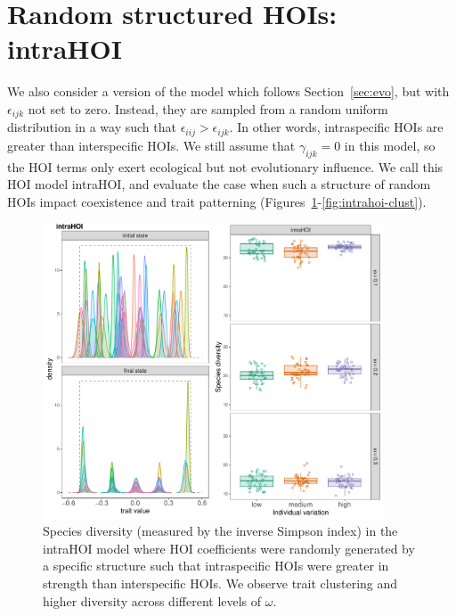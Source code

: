 \documentclass[10pt]{article}
\begin{document}
\section{Random structured HOIs: intraHOI}

We also consider a version of the model which follows Section~\ref{sec:evo}, but with $\epsilon_{ijk}$ not set to zero. Instead, they are sampled from a random uniform distribution in a way such that $\epsilon_{iij} > \epsilon_{ijk}$. In other words, intraspecific HOIs are greater than interspecific HOIs. We still assume that $\gamma_{ijk} = 0$ in this model, so the HOI terms only exert ecological but not evolutionary influence. We call this HOI model intraHOI, and evaluate the case when such a structure of random HOIs impact coexistence and trait patterning (Figures~\ref{fig:intrahoi-div}-\ref{fig:intrahoi-clust}).

\begin{figure}[!ht]
  \centering
  \includegraphics[width=0.9\textwidth]{intraHOI-diversity.pdf}
  \caption{Species diversity (measured by the inverse Simpson index) in the intraHOI model where HOI coefficients were randomly generated by a specific structure such that intraspecific HOIs were greater in strength than interspecific HOIs. We observe trait clustering and higher diversity across different levels of $\omega$.}
  \label{fig:intrahoi-div}
\end{figure}
\end{document}
